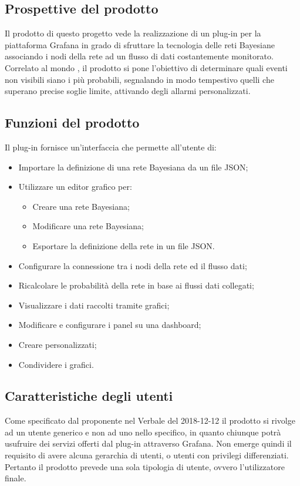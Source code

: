 
\subsection{Prospettive del prodotto}
Il prodotto di questo progetto vede la realizzazione di un plug-in per la piattaforma Grafana in grado di sfruttare la tecnologia delle reti Bayesiane associando i nodi della rete ad un flusso di dati costantemente monitorato. Correlato al mondo , il prodotto si pone l'obiettivo di determinare quali eventi non visibili siano i più probabili, segnalando in modo tempestivo quelli che superano precise soglie limite, attivando degli allarmi personalizzati. 

\subsection{Funzioni del prodotto}
Il plug-in fornisce un'interfaccia che permette all'utente di:

\begin{itemize}
	\item Importare la definizione di una rete Bayesiana da un file JSON;
	\item Utilizzare un editor grafico per:
	\begin{itemize}
		\item Creare una rete Bayesiana;
		\item Modificare una rete Bayesiana;
		\item Esportare la definizione della rete in un file JSON.
	\end{itemize}
	\item Configurare la connessione tra i nodi della rete ed il flusso dati;
	\item Ricalcolare le probabilità della rete in base ai flussi dati collegati;
	\item Visualizzare i dati raccolti tramite grafici;
	\item Modificare e configurare i panel su una dashboard;
	\item Creare  personalizzati;
	\item Condividere i grafici.
\end{itemize}

\subsection{Caratteristiche degli utenti}
Come specificato dal proponente nel Verbale del 2018-12-12 il prodotto si rivolge ad un utente generico e non ad uno nello specifico, in quanto chiunque potrà usufruire dei servizi offerti dal plug-in attraverso Grafana. Non emerge quindi il requisito di avere alcuna gerarchia di utenti, o utenti con privilegi differenziati. Pertanto il prodotto prevede una sola tipologia di utente, ovvero l’utilizzatore finale.

